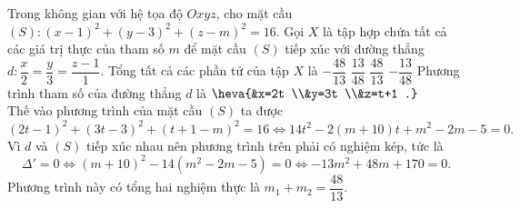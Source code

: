 \begin{ex}%
Trong không gian với hệ tọa độ $Oxyz$, cho mặt cầu $\left(S\right)\colon(x-1)^2 + (y-3)^2 + (z-m)^2 = 16$. Gọi $X$ là tập hợp chứa tất cả các giá trị thực của tham số $m$ để mặt cầu $\left(S\right)$ tiếp xúc với đường thẳng $d\colon\dfrac{x}{2} = \dfrac{y}{3} = \dfrac{z-1}{1}$. Tổng tất cả các phần tử của tập $X$ là
\choice
{$-\dfrac{48}{13}$}
{$\dfrac{13}{48}$}
{\True $\dfrac{48}{13}$}
{$-\dfrac{13}{48}$}
\loigiai
{
Phương trình tham số của đường thẳng $d$ là $\heva{&x=2t \\&y=3t \\&z=t+1  .}$\\
Thế vào phương trình của mặt cầu $\left(S\right)$ ta được
\[(2t-1)^2 + (3t-3)^2 + (t+1-m)^2 = 16 \Leftrightarrow 14t^2 - 2(m+10)t + m^2 - 2m -5 = 0.\]
Vì $d$ và $\left(S\right)$ tiếp xúc nhau nên phương trình trên phải có nghiệm kép, tức là
\[\Delta' = 0 \Leftrightarrow (m + 10)^2 - 14(m^2 - 2m -5) = 0\Leftrightarrow -13m^2 + 48m + 170 = 0.\]
Phương trình này có tổng hai nghiệm thực là $m_1 + m_2 = \dfrac{48}{13}$.
}
\end{ex}


